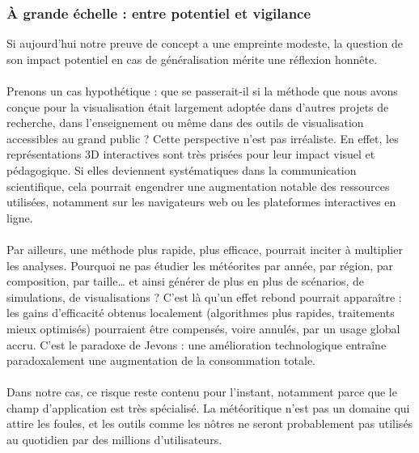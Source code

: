 \documentclass[12pt]{article}
\begin{document}
\subsubsection*{À grande échelle : entre potentiel et vigilance}

Si aujourd’hui notre preuve de concept a une empreinte modeste, la question de son impact potentiel en cas de généralisation mérite une réflexion honnête.\\
\\
Prenons un cas hypothétique : que se passerait-il si la méthode que nous avons conçue pour la visualisation était largement adoptée dans d’autres projets de recherche, dans l’enseignement ou même dans des outils de visualisation accessibles au grand public ? Cette perspective n’est pas irréaliste. En effet, les représentations 3D interactives sont très prisées pour leur impact visuel et pédagogique. Si elles deviennent systématiques dans la communication scientifique, cela pourrait engendrer une augmentation notable des ressources utilisées, notamment sur les navigateurs web ou les plateformes interactives en ligne.\\
\\
Par ailleurs, une méthode plus rapide, plus efficace, pourrait inciter à multiplier les analyses. Pourquoi ne pas étudier les météorites par année, par région, par composition, par taille… et ainsi générer de plus en plus de scénarios, de simulations, de visualisations ? C’est là qu’un effet rebond pourrait apparaître : les gains d’efficacité obtenus localement (algorithmes plus rapides, traitements mieux optimisés) pourraient être compensés, voire annulés, par un usage global accru. C’est le paradoxe de Jevons : une amélioration technologique entraîne paradoxalement une augmentation de la consommation totale.\\
\\
Dans notre cas, ce risque reste contenu pour l’instant, notamment parce que le champ d’application est très spécialisé. La météoritique n’est pas un domaine qui attire les foules, et les outils comme les nôtres ne seront probablement pas utilisés au quotidien par des millions d’utilisateurs.
 
\end{document}

